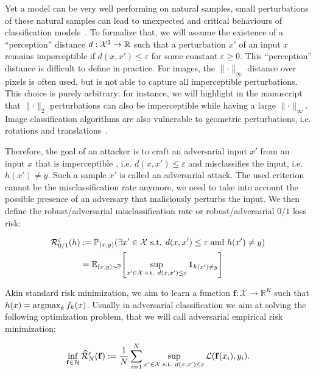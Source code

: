Yet a model can be very well performing on natural samples, small perturbations of these natural samples can lead to unexpected and critical behaviours of classification models~\citep{biggio2013evasion,Szegedy2013IntriguingPO}. To formalize that, we will assume the existence of a ``perception'' distance $d:\mathcal{X}^2\to\mathbb{R}$ such that a perturbation $x'$ of an input $x$ remains imperceptible if $d(x,x')\leq \varepsilon$ for some constant $\varepsilon\geq0$. This ``perception'' distance is difficult to define in practice. For images, the $\lVert\cdot\rVert_\infty$ distance over pixels is often used, but is not able to capture all imperceptible perturbations.  This choice is purely arbitrary: for instance, we will highlight in the manuscript that $\lVert\cdot\rVert_2$ perturbations can also be imperceptible while having a large $\lVert\cdot\rVert_\infty$. Image classification algorithms are also vulnerable to geometric perturbations, i.e. rotations and translations~\citep{xxx}.

Therefore, the goal of an attacker is to craft an adversarial input $x'$ from an input $x$ that is imperceptible , i.e. $d(x,x')\leq \varepsilon$ and misclassifies the input, i.e. $h(x')\neq y$. Such a sample $x'$ is called an adversarial attack. The used criterion cannot be the misclassification rate anymore, we need to take into account the possible presence of an adversary that maliciously perturbs the input. We then define the robust/adversarial misclassification rate or robust/adversarial $0/1$ loss risk: 

\begin{align*}
\risk_{0/1}^{\varepsilon}(h)&:=\PP_{(x,y)}(\exists x'\in\XX\text{ s.t. } d(x,x')\leq \varepsilon \text{ and } h(x')\neq y)\\
&= \EE_{(x,y)\sim\PP}\left[\sup_{x'\in\XX\text{ s.t. } d(x,x')\leq \varepsilon}\mathbf{1}_{h(x')\neq y}\right]
\end{align*}


Akin standard risk minimization, we aim to learn a function $\mathbf{f}:\mathcal{X}\to\mathbb{R}^K$ such that $h(x)=\operatorname*{argmax}_k f_k(x)$. Usually in adversarial classification we aim at solving the following optimization problem, that we will call adversarial empirical risk minimization:

\begin{align*}
\inf_{\mathbf{f}\in\mathcal{H}}\widehat{\mathcal{R}}^\varepsilon_{N}(\mathbf{f}):= \frac{1}{N}\sum_{i=1}^N\sup_{x'\in\mathcal{X}\text{ s.t. } d(x,x')\leq \varepsilon} \mathcal{L}(\mathbf{f}(x_i),y_i).
\end{align*}

